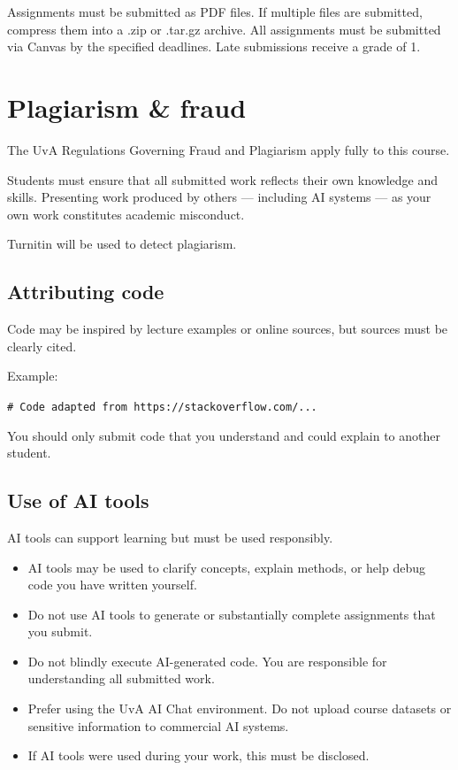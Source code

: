 \documentclass[a4paper,10pt]{report}
\begin{document}
Assignments must be submitted as PDF files. If multiple files are submitted, compress them into a .zip or .tar.gz archive.
All assignments must be submitted via Canvas by the specified deadlines. Late submissions receive a grade of 1.

\section{Plagiarism \& fraud}

The UvA Regulations Governing Fraud and Plagiarism apply fully to this course.

Students must ensure that all submitted work reflects their own knowledge and skills. Presenting work produced by others — including AI systems — as your own work constitutes academic misconduct.

Turnitin will be used to detect plagiarism.

\subsection{Attributing code}

Code may be inspired by lecture examples or online sources, but sources must be clearly cited.

Example:

\texttt{\# Code adapted from https://stackoverflow.com/...}

You should only submit code that you understand and could explain to another student.

\subsection{Use of AI tools}

AI tools can support learning but must be used responsibly.

\begin{itemize}

\item AI tools may be used to clarify concepts, explain methods, or help debug code you have written yourself.

\item Do not use AI tools to generate or substantially complete assignments that you submit.

\item Do not blindly execute AI-generated code. You are responsible for understanding all submitted work.

\item Prefer using the UvA AI Chat environment. Do not upload course datasets or sensitive information to commercial AI systems.

\item If AI tools were used during your work, this must be disclosed.

\end{itemize}
\end{document}
